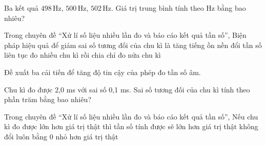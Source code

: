 \begin{ex}
Ba kết quả $498\,\text{Hz}$, $500\,\text{Hz}$, $502\,\text{Hz}$. Giá trị trung bình tính theo Hz bằng bao nhiêu?
\end{ex}

\begin{ex}
Trong chuyên đề “Xử lí số liệu nhiều lần đo và báo cáo kết quả tần số”, Biện pháp hiệu quả để giảm sai số tương đối của chu kì là
\choice
{tăng tiếng ồn nền}
{đổi tần số liên tục}
{\True đo nhiều chu kì rồi chia}
{chỉ đo nửa chu kì}
\end{ex}

\begin{ex}
Đề xuất ba cải tiến để tăng độ tin cậy của phép đo tần số âm.
\choiceTF

\end{ex}

\begin{ex}
Chu kì đo được 2,0 ms với sai số 0,1 ms. Sai số tương đối của chu kì tính theo phần trăm bằng bao nhiêu?
\end{ex}

\begin{ex}
Trong chuyên đề “Xử lí số liệu nhiều lần đo và báo cáo kết quả tần số”, Nếu chu kì đo được lớn hơn giá trị thật thì tần số tính được sẽ
\choice
{lớn hơn giá trị thật}
{không đổi}
{luôn bằng 0}
{\True nhỏ hơn giá trị thật}
\end{ex}

